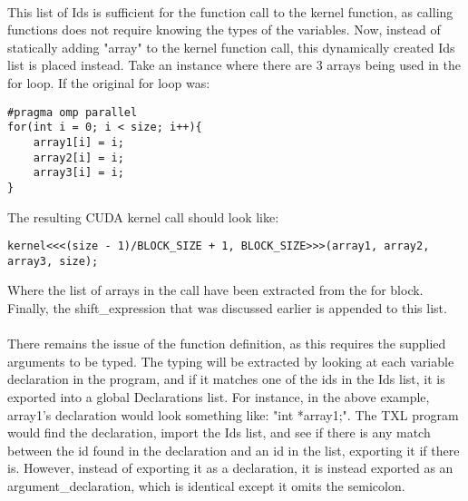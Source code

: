 \documentclass{article}
\begin{document}
\paragraph{}
This list of Ids is sufficient for the function call to the kernel function, as calling functions does not require knowing the types of the variables. Now, instead of statically adding "array" to the kernel function call, this dynamically created Ids list is placed instead. Take an instance where there are 3 arrays being used in the for loop. If the original for loop was:

\begin{lstlisting}
#pragma omp parallel
for(int i = 0; i < size; i++){
	array1[i] = i;
    array2[i] = i;
	array3[i] = i;
}
\end{lstlisting}

The resulting CUDA kernel call should look like:

\begin{lstlisting}
kernel<<<(size - 1)/BLOCK_SIZE + 1, BLOCK_SIZE>>>(array1, array2, array3, size);
\end{lstlisting}

Where the list of arrays in the call have been extracted from the for block. Finally, the shift\_expression that was discussed earlier is appended to this list. 

\paragraph{}
There remains the issue of the function definition, as this requires the supplied arguments to be typed. The typing will be extracted by looking at each variable declaration in the program, and if it matches one of the ids in the Ids list, it is exported into a global Declarations list. For instance, in the above example, array1's declaration would look something like: "int *array1;". The TXL program would find the declaration, import the Ids list, and see if there is any match between the id found in the declaration and an id in the list, exporting it if there is. However, instead of exporting it as a declaration, it is instead exported as an argument\_declaration, which is identical except it omits the semicolon. 
\end{document}
